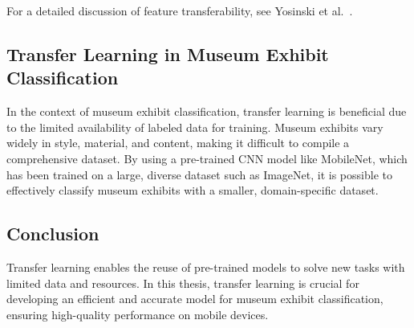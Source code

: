For a detailed discussion of feature transferability, see Yosinski et al.~\cite{yosinski_transfer_learning}.

\subsection{Transfer Learning in Museum Exhibit Classification}

In the context of museum exhibit classification, transfer learning is beneficial due to the limited availability of labeled data for training. Museum exhibits vary widely in style, material, and content, making it difficult to compile a comprehensive dataset. By using a pre-trained CNN model like MobileNet, which has been trained on a large, diverse dataset such as ImageNet, it is possible to effectively classify museum exhibits with a smaller, domain-specific dataset.

\subsection{Conclusion}

Transfer learning enables the reuse of pre-trained models to solve new tasks with limited data and resources. In this thesis, transfer learning is crucial for developing an efficient and accurate model for museum exhibit classification, ensuring high-quality performance on mobile devices.